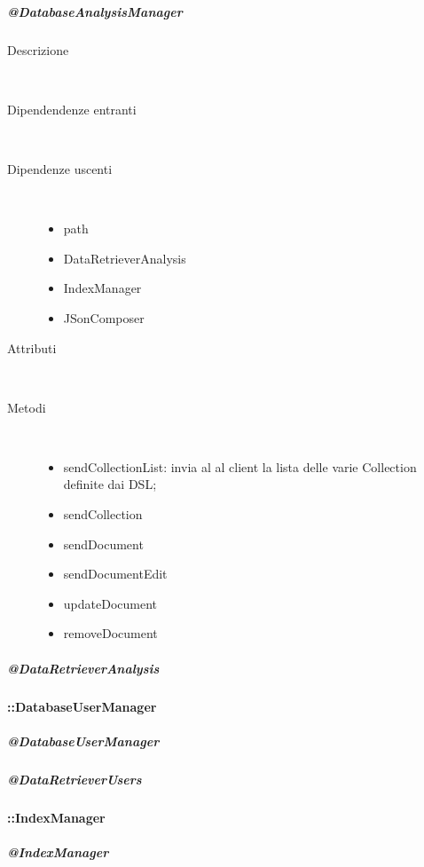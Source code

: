 \subparagraph{@DatabaseAnalysisManager}

\begin{description}
 \item[Descrizione] \hfill \\

 \item[Dipendendenze entranti] \hfill \\
 
 \item[Dipendenze uscenti] \hfill \\
 
 \begin{itemize}
 \item{path}
 \item{DataRetrieverAnalysis}
 \item{IndexManager}
 \item{JSonComposer}
 \end{itemize}
 
 \item[Attributi] \hfill \\
 
 \item[Metodi] \hfill \\
 \begin{itemize}
 \item{sendCollectionList:} invia al al client la lista delle varie Collection 
 definite dai DSL; 
 \item{sendCollection}
 \item{sendDocument}
 \item{sendDocumentEdit}
 \item{updateDocument}
 \item{removeDocument}
 \end{itemize}
 
\end{description}


\subparagraph{@DataRetrieverAnalysis}

\paragraph{::DatabaseUserManager}
\subparagraph{@DatabaseUserManager}
\subparagraph{@DataRetrieverUsers}

\paragraph{::IndexManager}
\subparagraph{@IndexManager}

